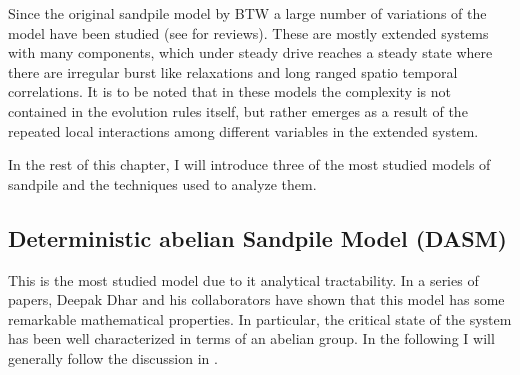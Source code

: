 \documentclass[11pt,a4paper]{book}
\begin{document}
Since the original sandpile model by BTW a large number of variations
of the model have been studied (see \cite{dharphysica06,jensen} for
reviews). These are mostly extended
systems with many components, which under steady drive reaches a
steady state where there are irregular burst like relaxations and long
ranged spatio temporal correlations.
It is to be noted that
in these models the complexity is not contained in the evolution rules itself, but
rather emerges as a result of the repeated local interactions among
different variables in the extended system.

In the rest of this chapter, I will introduce three of the most
studied models of sandpile and the techniques used to analyze them.

\subsection{Deterministic abelian Sandpile Model
(DASM)}\label{sec:dasm}
This is the most studied model due to it analytical tractability. In a
series of papers, Deepak Dhar and his collaborators have shown that
this model has some remarkable mathematical properties. In
particular, the critical state of the system has been
well characterized in terms of an abelian group. In the following I
will generally follow the discussion in \cite{dharphysica06}.
\end{document}
